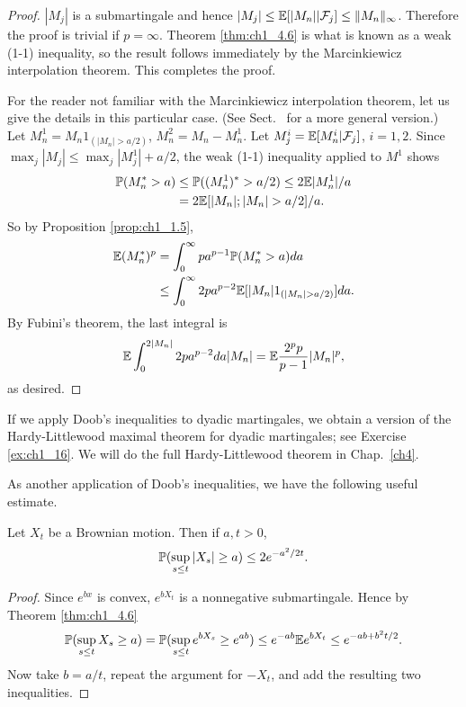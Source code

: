 \begin{proof}
$|M_j|$ is a submartingale and hence $|M_j| \leq \E[|M_n|\mid \FC_j] \leq \|M_n\|_\infty$. Therefore the proof is trivial if $p = \infty$. Theorem \ref{thm:ch1_4.6} is what is known as a weak (1-1) inequality, so the result follows immediately by the Marcinkiewicz interpolation theorem. This completes the proof.

For the reader not familiar with the Marcinkiewicz interpolation theorem, let us give the details in this particular case. (See Sect.\  for a more general version.) Let $M_n^1 = M_n1_{(|M_n|>a/2)}$, $M_n^2 = M_n - M_n^1$. Let $M_j^i = \E[M_n^i\mid \FC_j]$, $i = 1,2$. Since $\max_j|M_j| \leq \max_j|M_j^1| + a/2$, the weak (1-1) inequality applied to $M^1$ shows
\begin{align*}
    \P(M_n^* > a) &\leq \P((M_n^1)^* > a/2) \leq 2\E|M_n^1|/a \\
    &= 2\E[|M_n|;|M_n| > a/2]/a.
\end{align*}
So by Proposition \ref{prop:ch1_1.5},
\begin{align*}
    \E(M_n^*)^p  &= \int_0^\infty pa^{p-1}\P(M_n^* > a)da \\
    &\leq \int_0^\infty 2pa^{p-2}\E[|M_n|1_{(|M_n|>a/2)}]da.
\end{align*}
By Fubini's theorem, the last integral is
\[
    \E\int_0^{2|M_n|} 2pa^{p-2}da|M_n| = \E\frac{2^pp}{p-1}|M_n|^p,
\]
as desired.
\end{proof}



If we apply Doob's inequalities to dyadic martingales, we obtain a version of the Hardy-Littlewood maximal theorem for dyadic martingales; see Exercise \ref{ex:ch1_16}. We will do the full Hardy-Littlewood theorem in Chap.\ \ref{ch4}.

As another application of Doob's inequalities, we have the following useful estimate.

\begin{proposition}\label{prop:ch1_4.8}
Let $X_t$ be a Brownian motion. Then if $a,t > 0$,
\[
    \P(\sup_{s\leq t} |X_s| \geq a) \leq 2e^{-a^2/2t}.
\]
\end{proposition}

\begin{proof}
Since $e^{bx}$ is convex, $e^{bX_t}$ is a nonnegative submartingale. Hence by Theorem \ref{thm:ch1_4.6}
\[
    \P(\sup_{s\leq t} X_s \geq a) = \P(\sup_{s\leq t} e^{bX_s} \geq e^{ab}) \leq e^{-ab}\E e^{bX_t} \leq e^{-ab+b^2t/2}.
\]
Now take $b = a/t$, repeat the argument for $-X_t$, and add the resulting two inequalities.
\end{proof}

